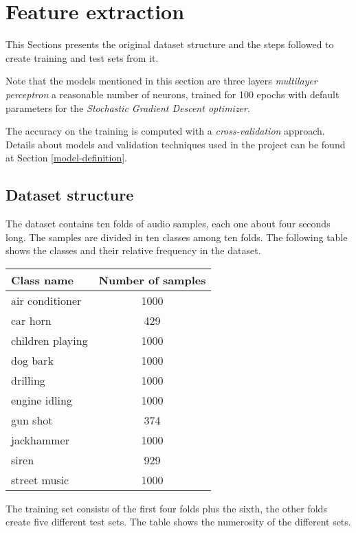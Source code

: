 \section{Feature extraction}
\label{feature-extraction}

This Sections presents the original dataset structure and the 
steps followed to create training and test sets from it.

Note that the models mentioned in this section are
three layers \emph{multilayer perceptron} a reasonable number of neurons, trained 
for 100 epochs with default parameters for the \emph{Stochastic Gradient 
Descent optimizer}.~\cite{mlp}~\cite{sgd}

The accuracy on the training is computed with a \emph{cross-validation} 
approach.~\cite{cross}
Details about models and validation techniques used in 
the project can be found at Section \vref{model-definition}.

\subsection{Dataset structure}
\label{dataset-structure}

The dataset contains ten folds of audio samples, each one about 
four seconds long. The samples are divided in ten classes among ten 
folds. The following table shows the classes and their relative frequency 
in the dataset.

\begin{center}
    \begin{tabular}{ |l|c| } 
        \hline
        Class name & Number of samples \\
        \hline
        air conditioner & 1000 \\
        car horn & 429 \\
        children playing & 1000 \\
        dog bark & 1000 \\
        drilling & 1000 \\
        engine idling & 1000 \\
        gun shot & 374 \\
        jackhammer & 1000 \\
        siren & 929 \\
        street music & 1000 \\
        \hline
    \end{tabular}
\end{center}

The training set consists of the first four folds plus the sixth, 
the other folds create five different test sets.
The table shows the numerosity of the different sets.

